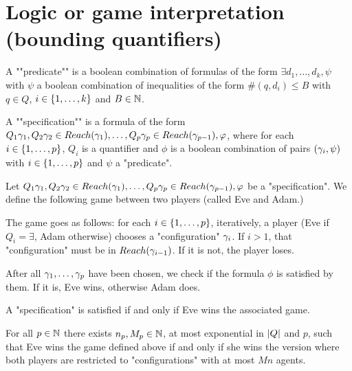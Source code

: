 \section{Logic or game interpretation (bounding quantifiers)}
\label{sec:quantifier-bounds}


\begin{definition}
	A ""predicate"" is a boolean combination of formulas of the form $\exists d_1, \ldots, d_k, \psi$ with $\psi$ a boolean combination of inequalities of the form $\#(q,d_i) \leq B$ with $q\in Q$, $i \in \{1,\dots,k\}$ and $B \in \mathbb{N}$.
	
	A ""specification"" is a formula of the form $Q_1 \gamma_1, Q_2 \gamma_2  \in Reach(\gamma_1), \ldots, Q_p \gamma_p \in Reach(\gamma_{p-1}), \varphi$, where for each $i \in \{1,\dots,p\}$, $Q_i$ is a quantifier and $\phi$ is a boolean combination of pairs $(\gamma_i, \psi)$ with $i \in \{1,\dots,p\}$ and $\psi$ a "predicate".
\end{definition}

\begin{definition}
	Let $Q_1 \gamma_1, Q_2 \gamma_2  \in Reach(\gamma_1), \ldots, Q_p \gamma_p \in Reach(\gamma_{p-1}), \varphi$ be a "specification". We define the following game between two players (called Eve and Adam.)
	
	The game goes as follows: for each $i \in \{1,\dots,p\}$, iteratively, a player (Eve if $Q_i = \exists$, Adam otherwise) chooses a "configuration" $\gamma_i$. 
	If $i>1$, that "configuration" must be in $Reach(\gamma_{i-1})$. If it is not, the player loses.
	
	After all $\gamma_1, \ldots, \gamma_p$ have been chosen, we check if the formula $\phi$ is satisfied by them. If it is, Eve wins, otherwise Adam does.
\end{definition}

\begin{lemma}
	A "specification" is satisfied if and only if Eve wins the associated game.
\end{lemma}

\begin{lemma}
	For all $p \in \mathbb{N}$ there exists $n_p, M_p \in \mathbb{N}$, at most exponential in $|Q|$ and $p$,  such that Eve wins the game defined above if and only if she wins the version where both players are restricted to "configurations" with at most $Mn$ agents.
\end{lemma}

